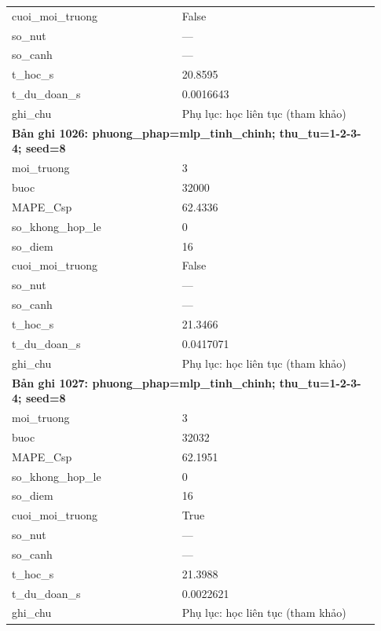 \begin{longtable}{p{0.43\linewidth}p{0.50\linewidth}}
cuoi\_\allowbreak moi\_\allowbreak truong & False \\
so\_\allowbreak nut & — \\
so\_\allowbreak canh & — \\
t\_\allowbreak hoc\_\allowbreak s & 20.8595 \\
t\_\allowbreak du\_\allowbreak doan\_\allowbreak s & 0.0016643 \\
ghi\_\allowbreak chu & Phụ lục: học liên tục (tham khảo) \\
\midrule
\multicolumn{2}{p{0.95\linewidth}}{\textbf{Bản ghi 1026: phuong\_phap=mlp\_tinh\_chinh; thu\_tu=1-2-3-4; seed=8}} \\
moi\_\allowbreak truong & 3 \\
buoc & 32000 \\
MAPE\_\allowbreak Csp & 62.4336 \\
so\_\allowbreak khong\_\allowbreak hop\_\allowbreak le & 0 \\
so\_\allowbreak diem & 16 \\
cuoi\_\allowbreak moi\_\allowbreak truong & False \\
so\_\allowbreak nut & — \\
so\_\allowbreak canh & — \\
t\_\allowbreak hoc\_\allowbreak s & 21.3466 \\
t\_\allowbreak du\_\allowbreak doan\_\allowbreak s & 0.0417071 \\
ghi\_\allowbreak chu & Phụ lục: học liên tục (tham khảo) \\
\midrule
\multicolumn{2}{p{0.95\linewidth}}{\textbf{Bản ghi 1027: phuong\_phap=mlp\_tinh\_chinh; thu\_tu=1-2-3-4; seed=8}} \\
moi\_\allowbreak truong & 3 \\
buoc & 32032 \\
MAPE\_\allowbreak Csp & 62.1951 \\
so\_\allowbreak khong\_\allowbreak hop\_\allowbreak le & 0 \\
so\_\allowbreak diem & 16 \\
cuoi\_\allowbreak moi\_\allowbreak truong & True \\
so\_\allowbreak nut & — \\
so\_\allowbreak canh & — \\
t\_\allowbreak hoc\_\allowbreak s & 21.3988 \\
t\_\allowbreak du\_\allowbreak doan\_\allowbreak s & 0.0022621 \\
ghi\_\allowbreak chu & Phụ lục: học liên tục (tham khảo) \\

\end{longtable}

